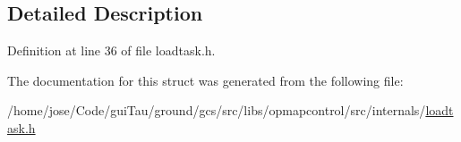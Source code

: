 \subsection{Detailed Description}


Definition at line 36 of file loadtask.\-h.



The documentation for this struct was generated from the following file\-:\begin{DoxyCompactItemize}
\item 
/home/jose/\-Code/gui\-Tau/ground/gcs/src/libs/opmapcontrol/src/internals/\hyperlink{loadtask_8h}{loadtask.\-h}\end{DoxyCompactItemize}
